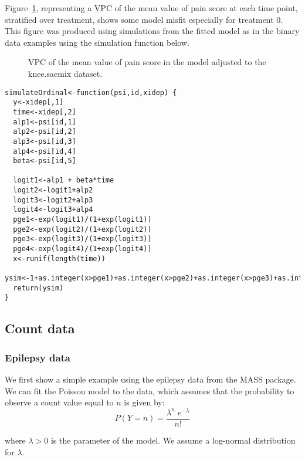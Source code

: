 Figure~\ref{fig:kneeMedScoreVPC}, representing a VPC of the mean value of pain score at each time point, stratified over treatment, shows some model misfit especially for treatment 0. This figure was produced using simulations from the fitted model as in the binary data examples using the simulation function below.
\begin{figure}[!h]
\begin{center}
\end{center}
\par \kern -0.5cm
\caption{VPC of the mean value of pain score in the model adjusted to the {\sf knee.saemix} dataset.} \label{fig:kneeMedScoreVPC}
\end{figure}

\begin{verbatim}
simulateOrdinal<-function(psi,id,xidep) {
  y<-xidep[,1]
  time<-xidep[,2]
  alp1<-psi[id,1]
  alp2<-psi[id,2]
  alp3<-psi[id,3]
  alp4<-psi[id,4]
  beta<-psi[id,5]
  
  logit1<-alp1 + beta*time
  logit2<-logit1+alp2
  logit3<-logit2+alp3
  logit4<-logit3+alp4
  pge1<-exp(logit1)/(1+exp(logit1))
  pge2<-exp(logit2)/(1+exp(logit2))
  pge3<-exp(logit3)/(1+exp(logit3))
  pge4<-exp(logit4)/(1+exp(logit4))
  x<-runif(length(time))
  ysim<-1+as.integer(x>pge1)+as.integer(x>pge2)+as.integer(x>pge3)+as.integer(x>pge4)
  return(ysim)
}
\end{verbatim}


\subsection{Count data} 

\subsubsection{Epilepsy data} \label{sec:epilepsyCount}

We first show a simple example using the {\sf epilepsy} data from the {\sf MASS} package. We can fit the Poisson model to the data, which assumes that the probability to observe a count value equal to $n$ is given by:
\begin{equation}
P(Y=n) = \frac{\lambda^n \; e^{-\lambda}}{n!}
\end{equation}

where $\lambda>0$ is the parameter of the model. We assume a log-normal distribution for $\lambda$.

